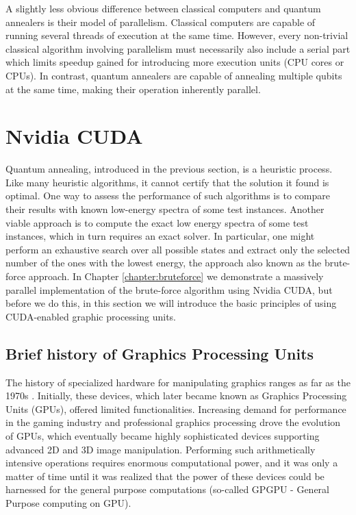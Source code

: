 A slightly less obvious difference between classical computers and quantum
annealers is their model of parallelism. Classical computers are capable of
running several threads of execution at the same time. However, every
non-trivial classical algorithm involving parallelism must necessarily also
include a serial part which limits speedup gained for introducing more
execution units (CPU cores or CPUs). In contrast, quantum annealers are capable
of annealing multiple qubits at the same time, making their operation
inherently parallel.

\section{Nvidia CUDA}

Quantum annealing, introduced in the previous section, is a heuristic process.
Like many heuristic algorithms, it cannot certify that the solution it found is
optimal. One way to assess the performance of such algorithms is to compare
their results with known low-energy spectra of some test instances. Another
viable approach is to compute the exact low energy spectra of some test
instances, which in turn requires an exact solver. In particular, one might
perform an exhaustive search over all possible states and extract only the
selected number of the ones with the lowest energy, the approach also known as
the brute-force approach. In Chapter \ref{chapter:bruteforce} we demonstrate a
massively parallel implementation of the brute-force algorithm using Nvidia
CUDA, but before we do this, in this section we will introduce the basic
principles of using CUDA-enabled graphic processing units.

\subsection{Brief history of Graphics Processing Units}
The history of specialized hardware for manipulating graphics ranges as far as
the 1970s \cite{framebuffer}. Initially, these devices, which later became
known as Graphics Processing Units (GPUs), offered limited functionalities.
Increasing demand for performance in the gaming industry and professional
graphics processing drove the evolution of GPUs, which eventually became highly
sophisticated devices supporting advanced 2D and 3D image manipulation.
Performing such arithmetically intensive operations requires enormous
computational power, and it was only a matter of time until it was realized
that the power of these devices could be harnessed for the general purpose
computations (so-called GPGPU - General Purpose computing on GPU).

